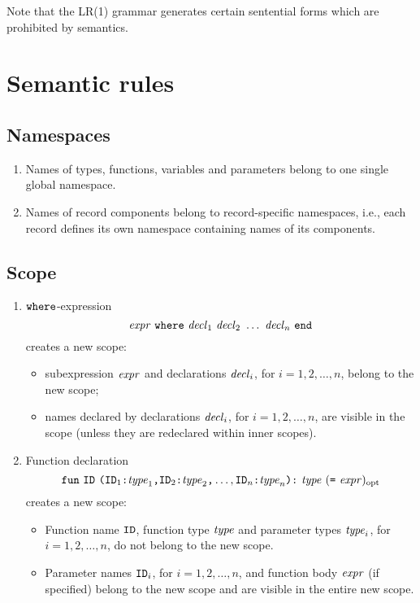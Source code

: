 \documentclass[10pt]{article}
\begin{document}
Note that the LR(1) grammar generates certain sentential forms which are prohibited by semantics.

\section{Semantic rules}

\subsection{Namespaces}

\begin{enumerate}
\item Names of types, functions, variables and parameters belong to one single global namespace.
\item Names of record components belong to record-specific namespaces, i.e., each record defines its own namespace containing names of its components.
\end{enumerate}

\subsection{Scope}

\begin{enumerate}

\item $ \mbox{\texttt{where}} $-expression
$$ \nont{expr}\ \term{where}\ \nont{decl}_1\ \nont{decl}_2\ \ldots\ \nont{decl}_n\  \term{end}$$
creates a new scope:
\begin{itemize}
\item subexpression $ \mbox{\textit{expr}} $ and declarations $ \mbox{\textit{decl}}_i $, for $ i = 1,2,\ldots, n $, belong to the new scope;
\item names declared by declarations $ \mbox{\textit{decl}}_i $, for $ i = 1,2,\ldots, n $, are visible in the scope (unless they are redeclared within inner scopes). 
\end{itemize}

\item Function declaration $$ \term{fun}\ \term{ID}\ \term{(} \term{ID}_1\term{:}\nont{type}_1\term{,}\term{ID}_2\term{:}\nont{type}_2\term{,}\ldots,\term{ID}_n\term{:}\nont{type}_n\term{)}\term{:}\ \nont{type}\ (\term{=}\ \nont{expr})_\mathrm{opt} $$
creates a new scope:
\begin{itemize}
\item Function name $ \mbox{\texttt{ID}} $, function type $ \mbox{\textit{type}} $ and parameter types $ \mbox{\textit{type}}_i $, for $ i = 1,2,\ldots, n $, do not belong to the new scope.
\item Parameter names $ \mbox{\texttt{ID}}_i $, for $ i = 1,2,\ldots, n $, and function body $ \mbox{\textit{expr}} $ (if specified) belong to the new scope and are visible in the entire new scope.
\end{itemize}

\end{enumerate}
\end{document}
